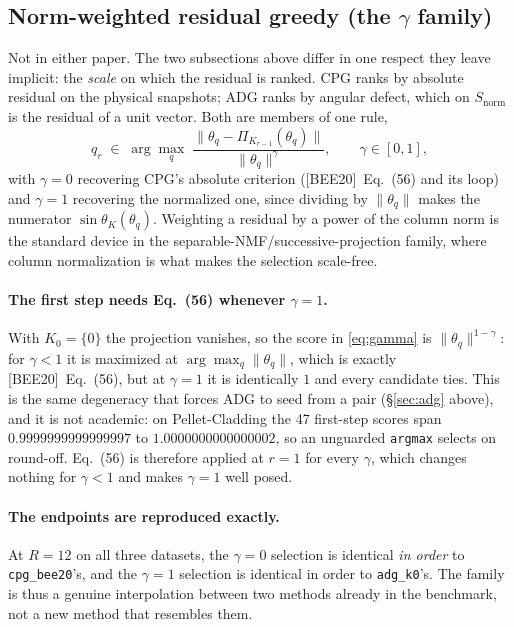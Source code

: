 \documentclass[11pt,a4paper]{article}
\newcommand{\bee}{\textsf{[BEE20]}}
\begin{document}
\subsection{Norm-weighted residual greedy (the $\gamma$ family)}\label{sec:gammadef}

Not in either paper. The two subsections above differ in one respect they leave implicit:
the \emph{scale} on which the residual is ranked. CPG ranks by absolute residual on the
physical snapshots; ADG ranks by angular defect, which on $S_{\mathrm{norm}}$ is the
residual of a unit vector. Both are members of one rule,
\begin{equation}
q_r \;\in\; \arg\max_q\;
\frac{\bigl\|\theta_q-\Pi_{K_{r-1}}(\theta_q)\bigr\|}{\|\theta_q\|^{\gamma}},
\qquad \gamma\in[0,1],
\label{eq:gamma}
\end{equation}
with $\gamma=0$ recovering CPG's absolute criterion (\bee{}~Eq.~(56) and its loop) and
$\gamma=1$ recovering the normalized one, since dividing by $\|\theta_q\|$ makes the
numerator $\sin\theta_{K}(\theta_q)$. Weighting a residual by a power of the column norm
is the standard device in the separable-NMF/successive-projection family, where
column normalization is what makes the selection scale-free.

\paragraph{The first step needs Eq.~(56) whenever $\gamma=1$.} With $K_0=\{0\}$ the
projection vanishes, so the score in \eqref{eq:gamma} is $\|\theta_q\|^{1-\gamma}$: for
$\gamma<1$ it is maximized at $\arg\max_q\|\theta_q\|$, which is exactly \bee{}~Eq.~(56),
but at $\gamma=1$ it is identically $1$ and every candidate ties. This is the same
degeneracy that forces ADG to seed from a pair (\S\ref{sec:adg} above), and it is not
academic: on Pellet-Cladding the 47 first-step scores span
$0.9999999999999997$ to $1.0000000000000002$, so an unguarded \texttt{argmax} selects on
round-off. Eq.~(56) is therefore applied at $r=1$ for every $\gamma$, which changes
nothing for $\gamma<1$ and makes $\gamma=1$ well posed.

\paragraph{The endpoints are reproduced exactly.} At $R=12$ on all three datasets, the
$\gamma=0$ selection is identical \emph{in order} to \texttt{cpg\_bee20}'s, and the
$\gamma=1$ selection is identical in order to \texttt{adg\_k0}'s. The family is thus a
genuine interpolation between two methods already in the benchmark, not a new method that
resembles them.
\end{document}
